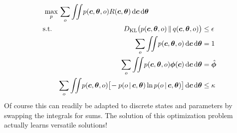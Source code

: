 			\begin{equation*}
				\begin{aligned}
					\max_p \,           & \sum_o \iint\! p(\bm{c}, \bm{\theta}, o) R(\bm{c}, \bm{\theta}) \dd{\bm{c}} \dd{\bm{\theta}} \\
					\mathrm{s.t.} \quad &
					\begin{aligned}[t]
						D_\mathrm{KL}\big( p(\bm{c}, \bm{\theta}, o) \,\Vert\, q(\bm{c}, \bm{\theta}, o) \big)                                                                       & \leq \epsilon      \\
						\sum_o \iint\! p(\bm{c}, \bm{\theta}, o) \dd{\bm{c}} \dd{\bm{\theta}}                                                                                        & = 1                \\
						\sum_o \iint\! p(\bm{c}, \bm{\theta}, o) \bm{\phi}(\bm{c}) \dd{\bm{c}} \dd{\bm{\theta}}                                                                    & = \hat{\bm{\phi}} \\
						\sum_o \iint\! p(\bm{c}, \bm{\theta}, o) \big[\! -p(o \,\vert\, \bm{c}, \bm{\theta}) \ln p(o \,\vert\, \bm{c}, \bm{\theta}) \big] \dd{\bm{c}} \dd{\bm{\theta}} & \leq \kappa
					\end{aligned}
				\end{aligned}
			\end{equation*}
			Of course this can readily be adapted to discrete states and parameters by swapping the integrals for sums. The solution of this optimization problem actually learns versatile solutions!

